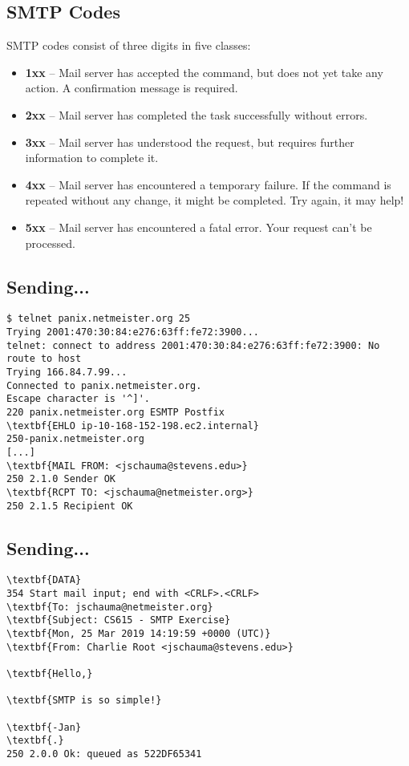 \documentclass[xga]{xdvislides}
\begin{document}
\subsection{SMTP Codes}
SMTP codes consist of three digits in five classes:
\begin{itemize}
	\item {\bf 1xx} --  Mail server has accepted the command, but does not yet
		take any action. A confirmation message is required.
	\item {\bf 2xx} --  Mail server has completed the task successfully
		without errors.
	\item {\bf 3xx} --  Mail server has understood the request, but requires
		further information to complete it.
	\item {\bf 4xx} --  Mail server has encountered a temporary failure. If
		the command is repeated without any change, it might be
		completed. Try again, it may help!
	\item {\bf 5xx} --  Mail server has encountered a fatal error. Your
		request can't be processed.
\end{itemize}


\subsection{Sending...}
\begin{Verbatim}
$ telnet panix.netmeister.org 25
Trying 2001:470:30:84:e276:63ff:fe72:3900...
telnet: connect to address 2001:470:30:84:e276:63ff:fe72:3900: No route to host
Trying 166.84.7.99...
Connected to panix.netmeister.org.
Escape character is '^]'.
220 panix.netmeister.org ESMTP Postfix
\textbf{EHLO ip-10-168-152-198.ec2.internal}
250-panix.netmeister.org
[...]
\textbf{MAIL FROM: <jschauma@stevens.edu>}
250 2.1.0 Sender OK
\textbf{RCPT TO: <jschauma@netmeister.org>}
250 2.1.5 Recipient OK
\end{Verbatim}

\subsection{Sending...}
\begin{Verbatim}
\textbf{DATA}
354 Start mail input; end with <CRLF>.<CRLF>
\textbf{To: jschauma@netmeister.org}
\textbf{Subject: CS615 - SMTP Exercise}
\textbf{Mon, 25 Mar 2019 14:19:59 +0000 (UTC)}
\textbf{From: Charlie Root <jschauma@stevens.edu>}

\textbf{Hello,}

\textbf{SMTP is so simple!}

\textbf{-Jan}
\textbf{.}
250 2.0.0 Ok: queued as 522DF65341
\end{Verbatim}
\end{document}
